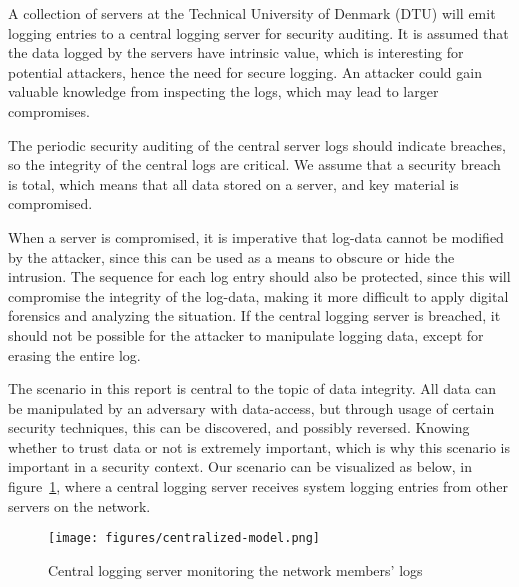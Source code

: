 
A collection of servers at the Technical University of Denmark (DTU)
will emit logging entries to a central logging server for security
auditing. It is assumed that the data logged by the servers have
intrinsic value, which is interesting for potential attackers, hence
the need for secure logging. An attacker could gain valuable knowledge
from inspecting the logs, which may lead to larger compromises.

The periodic security auditing of the central server logs should
indicate breaches, so the integrity of the central logs are critical.
We assume that a security breach is total, which means that all data
stored on a server, and key material is compromised.

When a server is compromised, it is imperative that log-data cannot be
modified by the attacker, since this can be used as a means to obscure
or hide the intrusion. The sequence for each log entry should also be
protected, since this will compromise the integrity of the log-data,
making it more difficult to apply digital forensics and analyzing the
situation. If the central logging server is breached, it should not be
possible for the attacker to manipulate logging data, except for
erasing the entire log.

The scenario in this report is central to the topic of data
integrity. All data can be manipulated by an adversary with
data-access, but through usage of certain security techniques, this
can be discovered, and possibly reversed. Knowing whether to trust
data or not is extremely important, which is why this scenario is
important in a security context.  Our scenario can be visualized as
below, in figure~\ref{fig:model}, where a central logging server
receives system logging entries from other servers on the network.

\begin{figure}[H]
  \centering
  \texttt{[image: figures/centralized-model.png]}
  \caption{\label{fig:model} Central logging server monitoring the
    network members' logs}
\end{figure}

